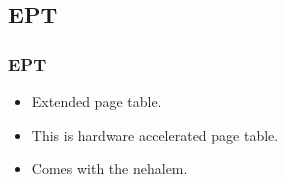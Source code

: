 \begin{frame}
\begin{overlayarea}{10cm}{10cm}
\end{overlayarea}
\end{frame}

\subsection{EPT}
\begin{frame}
\frametitle{EPT}
\begin{itemize}
\item Extended page table.
\item This is hardware accelerated page table.
\item Comes with the nehalem.
\end{itemize}
\end{frame}


